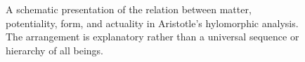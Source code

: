 \begin{figure}[htbp]
\begin{tikzpicture}
    \end{tikzpicture}

    \caption{A schematic presentation of the relation between matter,
    potentiality, form, and actuality in Aristotle's hylomorphic
    analysis. The arrangement is explanatory rather than a
    universal sequence or hierarchy of all beings.}
    \label{fig:aristotle-potentiality-actuality-form}
\end{figure}

